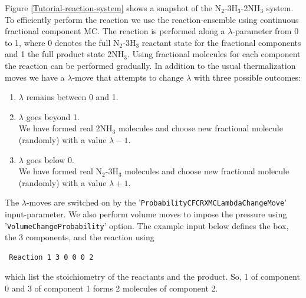 Figure \ref{Tutorial-reaction-system} shows a snapshot of the N$_2$-3H$_3$-2NH$_3$ system. To efficiently
perform the reaction we use the reaction-ensemble using continuous fractional component MC. The reaction is performed
along a $\lambda$-parameter from 0 to 1, where 0 denotes the full N$_2$-3H$_3$ reactant state for the fractional components and
1 the full product state 2NH$_3$. Using fractional molecules for each component the reaction can be
performed gradually. In addition to the usual thermalization moves we have a $\lambda$-move that attempts to
change $\lambda$ with three possible outcomes:
\begin{enumerate}
\item{$\lambda$ remains between 0 and 1.}
\item{$\lambda$ goes beyond 1.}\\
We have formed real 2NH$_3$ molecules and choose new fractional molecule (randomly) with a value $\lambda-1$.
\item{$\lambda$ goes below 0.}\\
We have formed real N$_2$-3H$_3$ molecules and choose new fractional molecule (randomly) with a value $\lambda+1$.
\end{enumerate}
The $\lambda$-moves are switched on by the '\verb+ProbabilityCFCRXMCLambdaChangeMove+' input-parameter. We
also perform volume moves to impose the pressure using '\verb+VolumeChangeProbability+' option.
The example input below defines the box, the 3 components, and the reaction using
\begin{verbatim}
 Reaction 1 3 0 0 0 2 
\end{verbatim}
which list the stoichiometry of the reactants and the product. So, 1 of component 0 and 3 of component 1 forms 2
molecules of component 2.



